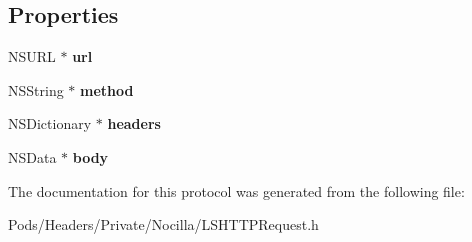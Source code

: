 \subsection*{Properties}
\begin{DoxyCompactItemize}
\item 
\hypertarget{protocol_l_s_h_t_t_p_request-p_a9190c7f3e2220be0995f91a6c19368f1}{N\-S\-U\-R\-L $\ast$ {\bfseries url}}\label{protocol_l_s_h_t_t_p_request-p_a9190c7f3e2220be0995f91a6c19368f1}

\item 
\hypertarget{protocol_l_s_h_t_t_p_request-p_a93147301503d61f8860cc990aa64f248}{N\-S\-String $\ast$ {\bfseries method}}\label{protocol_l_s_h_t_t_p_request-p_a93147301503d61f8860cc990aa64f248}

\item 
\hypertarget{protocol_l_s_h_t_t_p_request-p_ac39014508c5ecd536949682fba6139bb}{N\-S\-Dictionary $\ast$ {\bfseries headers}}\label{protocol_l_s_h_t_t_p_request-p_ac39014508c5ecd536949682fba6139bb}

\item 
\hypertarget{protocol_l_s_h_t_t_p_request-p_ae76e96f475c5d4f6d69272c961e4117e}{N\-S\-Data $\ast$ {\bfseries body}}\label{protocol_l_s_h_t_t_p_request-p_ae76e96f475c5d4f6d69272c961e4117e}

\end{DoxyCompactItemize}


The documentation for this protocol was generated from the following file\-:\begin{DoxyCompactItemize}
\item 
Pods/\-Headers/\-Private/\-Nocilla/L\-S\-H\-T\-T\-P\-Request.\-h\end{DoxyCompactItemize}
